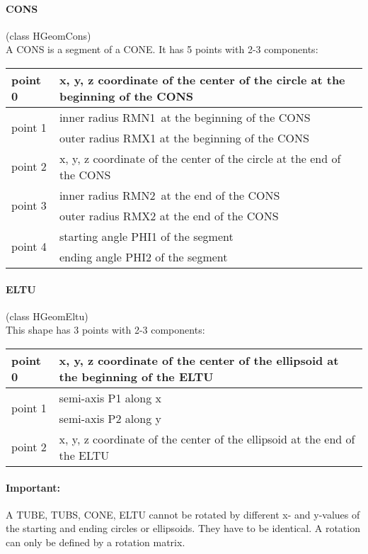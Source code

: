 \paragraph{CONS} (class HGeomCons)\\
A CONS is a segment of a CONE. It has 5 points with 2-3 components:\\
\begin{tabular}{|l|l|}
  \hline
  point 0                  & x, y, z coordinate of the center of the circle at the beginning of the CONS\\
  \hline
  \multirow{2}{*}{point 1} & inner radius RMN1\ at the beginning of the CONS\\
                           & outer radius RMX1 at the beginning of the CONS\\
  \hline
  point 2                  & x, y, z coordinate of the center of the circle at the end of the CONS\\
  \hline
  \multirow{2}{*}{point 3} & inner radius RMN2\ at the end of the CONS\\
                           & outer radius RMX2 at the end of the CONS\\
  \hline
  \multirow{2}{*}{point 4} & starting angle PHI1 of the segment\\
                           & ending angle PHI2 of the segment\\
   \hline
\end{tabular}

\paragraph{ELTU} (class HGeomEltu)\\
This shape has 3 points with 2-3 components:\\
\begin{tabular}{|l|l|}
  \hline
  point 0                  & x, y, z coordinate of the center of the ellipsoid at the beginning of the ELTU\\
  \hline
  \multirow{2}{*}{point 1} & semi-axis P1 along x\\
                           & semi-axis P2 along y\\
  \hline
  point 2                  & x, y, z coordinate of the center of the ellipsoid at the end of the ELTU\\
  \hline
\end{tabular}

\paragraph{Important:} A TUBE, TUBS, CONE, ELTU cannot be rotated by different x- and y-values of the starting and ending 
circles or ellipsoids. They have to be identical. A rotation can only be defined by a rotation matrix.


